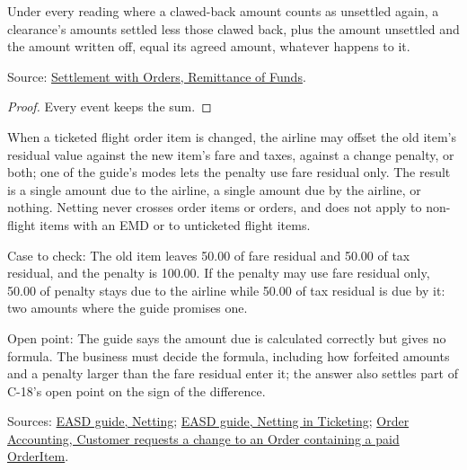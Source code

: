 \begin{theorem}
  \label{thm:accounting-amounts-accounted-reopen}
  Under every reading where a clawed-back amount counts as unsettled again,
  a clearance's amounts settled less those clawed back, plus the amount
  unsettled and the amount written off, equal its agreed amount, whatever
  happens to it.

  Source: \href{https://standards.atlassian.net/wiki/spaces/SWO/pages/574718145}{Settlement with Orders, Remittance of Funds}.
\end{theorem}
\begin{proof}
  Every event keeps the sum.
\end{proof}

\begin{definition}
  \label{def:accounting-change-netting}
  \notready
  When a ticketed flight order item is changed, the airline may offset the
  old item's residual value against the new item's fare and taxes, against a
  change penalty, or both; one of the guide's modes lets the penalty use
  fare residual only. The result is a single amount due to the airline, a
  single amount due by the airline, or nothing. Netting never crosses order
  items or orders, and does not apply to non-flight items with an EMD or to
  unticketed flight items.

  Case to check: The old item leaves 50.00 of fare residual and 50.00 of tax
  residual, and the penalty is 100.00. If the penalty may use fare residual
  only, 50.00 of penalty stays due to the airline while 50.00 of tax
  residual is due by it: two amounts where the guide promises one.

  Open point: The guide says the amount due is calculated correctly but
  gives no formula. The business must decide the formula, including how
  forfeited amounts and a penalty larger than the fare residual enter it;
  the answer also settles part of C-18's open point on the sign of the
  difference.

  Sources: \href{https://standards.atlassian.net/wiki/spaces/EASD/pages/574488643}{EASD guide, Netting};
  \href{https://standards.atlassian.net/wiki/spaces/EASD/pages/574783623}{EASD guide, Netting in Ticketing};
  \href{https://standards.atlassian.net/wiki/spaces/OA/pages/844202079}{Order Accounting, Customer requests a change to an Order containing a paid OrderItem}.
\end{definition}

